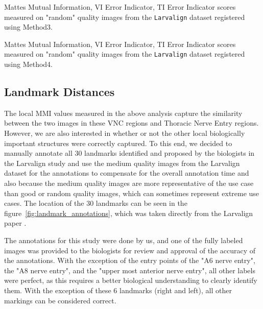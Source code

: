 \documentclass{report}
\begin{document}
	\begin{table}[H]
		\centering
		
		\caption{Mattes Mutual Information, VI Error Indicator, TI Error Indicator scores measured on "random" quality images from the \texttt{Larvalign} dataset registered using Method3.}
		\label{table:quality_vanilla_random}
	\end{table}

	\begin{table}[H]
		\centering
		
		\caption{Mattes Mutual Information, VI Error Indicator, TI Error Indicator scores measured on "random" quality images from the \texttt{Larvalign} dataset registered using Method4.}
		\label{table:quality_ldm_random}
	\end{table}

	\subsection{Landmark Distances}
	The local MMI values measured in the above analysis capture the similarity between the two images in these VNC regions and Thoracic Nerve Entry regions. However, we are also interested in whether or not the other local biologically important structures were correctly captured. To this end, we decided to manually annotate all 30 landmarks identified and proposed by the biologists in the Larvalign study and use the medium quality images from the Larvalign dataset for the annotations to compensate for the overall annotation time and also because the medium quality images are more representative of the use case than good or random quality images, which can sometimes represent extreme use cases. The location of the 30 landmarks can be seen in the figure~\ref{fig:landmark_annotations}, which was taken directly from the Larvalign paper \cite{larvalign}.
	
	The annotations for this study were done by us, and one of the fully labeled images was provided to the biologists for review and approval of the accuracy of the annotations. With the exception of the entry points of the "A6 nerve entry", the "A8 nerve entry", and the "upper most anterior nerve entry", all other labels were perfect, as this requires a better biological understanding to clearly identify them. With the exception of these 6 landmarks (right and left), all other markings can be considered correct.
	
	
	
	
	
\end{document}

